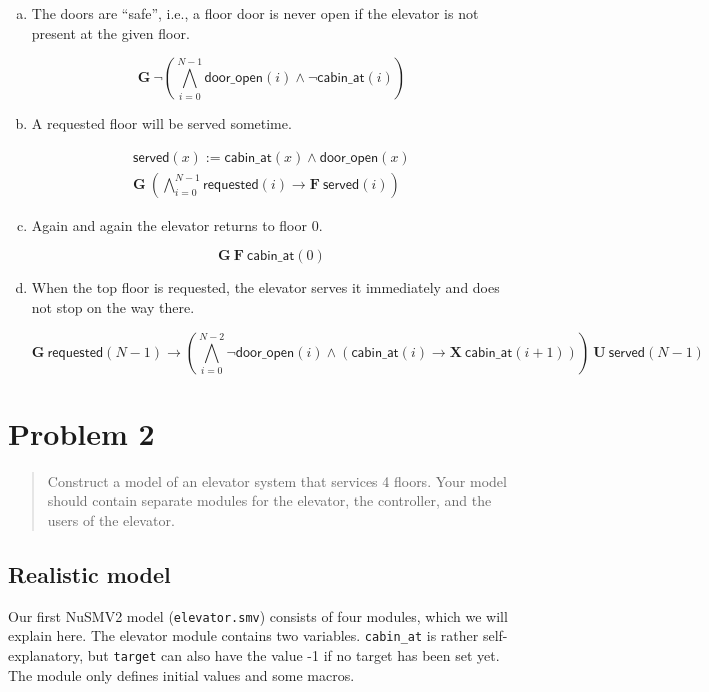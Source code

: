 \documentclass[a4paper,10pt]{article}
\newcommand{\LTLG}{\mathbf{G~}}
\newcommand{\LTLF}{\mathbf{F~}}
\newcommand{\LTLX}{\mathbf{X~}}
\newcommand{\LTLU}{\mathbf{~U~}}
\newcommand{\conjall}[2]{\mathop{\bigwedge}\limits_{#1}^{#2}}
\newcommand{\dooropen}[1]{\mathsf{door\_open}(#1)}
\newcommand{\cabinat}[1]{\mathsf{cabin\_at}(#1)}
\newcommand{\requested}[1]{\mathsf{requested}(#1)}
\newcommand{\served}[1]{\mathsf{served}(#1)}
\newcommand{\imply}{\rightarrow}
\begin{document}
	\begin{enumerate}[(a)]
		\item
			The doors are ``safe'', i.e., a floor door is never open if the elevator is not present at the given floor.
			
			\[
				\LTLG \neg \left( \conjall{i=0}{N-1} \dooropen{i} \wedge \neg \cabinat{i} \right)
			\]
		
		\item
			A requested floor will be served sometime.
			
			\begin{align*}
				\served{x} := \cabinat{x} \wedge \dooropen{x} \\
				\LTLG \left( \conjall{i=0}{N-1} \requested{i} \imply \LTLF \served{i} \right)
			\end{align*}
		
		\item
			Again and again the elevator returns to floor 0.
			
			\[
				\LTLG \LTLF \cabinat{0}
			\]
		
		\item
			When the top floor is requested, the elevator serves it immediately and does not stop on the way there.
			
			\[
				\LTLG \requested{N-1} \imply
					\left(
						\conjall{i=0}{N-2}
							\neg \dooropen{i} \wedge ( \cabinat{i} \imply \LTLX \cabinat{i+1} )
					\right)
					\LTLU
					\served{N-1}
			\]
	\end{enumerate}
	
	\section{Problem 2}
	
	\begin{quote}
		Construct a model of an elevator system that services 4 floors. Your model should contain separate modules for the elevator, the controller, and the users of the elevator.
	\end{quote}
	
	\subsection{Realistic model}
	Our first NuSMV2 model (\texttt{elevator.smv}) consists of four modules, which we will explain here. The elevator module contains two variables. \texttt{cabin\_at} is rather self-explanatory, but \texttt{target} can also have the value -1 if no target has been set yet. The module only defines initial values and some macros.
	
\end{document}
